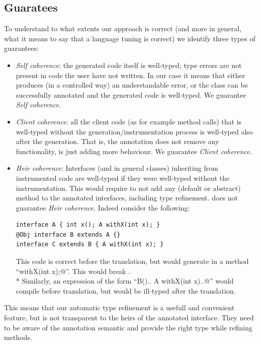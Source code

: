 \subsection{Guaratees}
To understand to what extents our approach is correct (and more in general, what it means to say that a language tuning is correct) we identify three types of guarantees:
\begin{itemize}
\item \textit{Self coherence}: the generated code itself is well-typed; type errors are not present in code the user have not written.
In our case it means that either \mixin{} produces (in a controlled way) an understandable error, or the class can be successfully annotated and the generated code is well-typed.
We guarantee \textit{Self coherence}.

\item \textit{Client coherence}: all the client code (as for example method calls) that is well-typed without the generation/instrumentation process is well-typed also after the generation.
That is, the annotation does not remove any functionality, is just
adding more behaviour.
We guarantee \textit{Client coherence}.

\item \textit{Heir coherence}: Interfaces (and in general classes) inheriting from instrumented code are well-typed if they were well-typed without the instrumentation.
This would require to not add any (default or abstract) method to the annotated interfaces, including type refinement.
\mixin  does not guarantee \textit{Heir coherence}.
Indeed consider the following:

\begin{lstlisting}
interface A { int x(); A withX(int x); }
@Obj interface B extends A {}
interface C extends B { A withX(int x); }
\end{lstlisting}

\noindent This code is correct before the translation, but \mixin would  generate in \Q@B@  a method ``\Q@B withX(int x);@''.
This would break \Q@C@. \\*
Similarly, an expression of the form ``\Q@new B(){.. A withX(int x){..}}@'' would compile before translation, but would be ill-typed after the translation.
\end{itemize}

\noindent This means that our automatic type refinement 
is a usefull and convenient feature, but is not transparent to the heirs of the annotated interface. They need to be aware of the annotation semantic  and provide the right type while refining methods.

